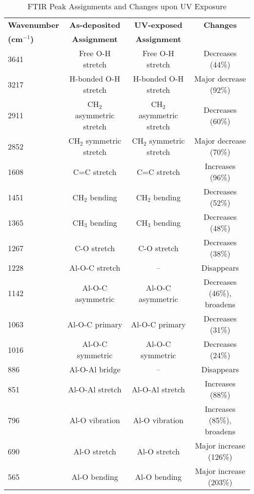 \begin{table}[h]
\centering
\caption{FTIR Peak Assignments and Changes upon UV Exposure}
\label{tab:ftir_peaks}
\begin{tabular}{lccc}
\hline
\textbf{Wavenumber} & \textbf{As-deposited} & \textbf{UV-exposed} & \textbf{Changes} \\
\textbf{(cm$^{-1}$)} & \textbf{Assignment} & \textbf{Assignment} & \\
\hline
3641 & Free O-H stretch & Free O-H stretch & Decreases (44\%) \\
3217 & H-bonded O-H stretch & H-bonded O-H stretch & Major decrease (92\%) \\
2911 & CH$_2$ asymmetric stretch & CH$_2$ asymmetric stretch & Decreases (60\%) \\
2852 & CH$_2$ symmetric stretch & CH$_2$ symmetric stretch & Major decrease (70\%) \\
1608 & C=C stretch & C=C stretch & Increases (96\%) \\
1451 & CH$_2$ bending & CH$_2$ bending & Decreases (52\%) \\
1365 & CH$_3$ bending & CH$_3$ bending & Decreases (48\%) \\
1267 & C-O stretch & C-O stretch & Decreases (38\%) \\
1228 & Al-O-C stretch & -- & Disappears \\
1142 & Al-O-C asymmetric & Al-O-C asymmetric & Decreases (46\%), broadens \\
1063 & Al-O-C primary & Al-O-C primary & Decreases (31\%) \\
1016 & Al-O-C symmetric & Al-O-C symmetric & Decreases (24\%) \\
886 & Al-O-Al bridge & -- & Disappears \\
851 & Al-O-Al stretch & Al-O-Al stretch & Increases (88\%) \\
796 & Al-O vibration & Al-O vibration & Increases (85\%), broadens \\
690 & Al-O stretch & Al-O stretch & Major increase (126\%) \\
565 & Al-O bending & Al-O bending & Major increase (203\%) \\
\hline
\end{tabular}
\end{table}
